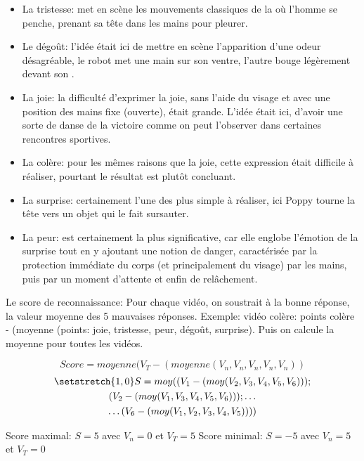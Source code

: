                 \begin{itemize}\myItemStyle
                    \item    La tristesse: met en scène les mouvements classiques de la  où l’homme se penche, prenant sa tête dans les mains pour pleurer.
                    \item    Le dégoût: l’idée était ici de mettre en scène l’apparition d’une odeur désagréable, le robot met une main sur son ventre, l’autre bouge légèrement devant son .
                    \item    La joie: la difficulté d’exprimer la joie, sans l’aide du visage et avec une position des mains fixe (ouverte), était grande. L’idée était ici, d’avoir une sorte de danse de la victoire comme on peut l’observer dans certaines rencontres sportives.
                    \item    La colère: pour les mêmes raisons que la joie, cette expression était difficile à réaliser, pourtant le résultat est plutôt concluant.
                    \item    La surprise: certainement l’une des plus simple à réaliser, ici Poppy tourne la tête vers un objet qui le fait sursauter.
                    \item    La peur: est certainement la plus significative, car elle englobe l’émotion de la surprise tout en y ajoutant une notion de danger, caractérisée par la protection immédiate du corps (et principalement du visage) par les mains, puis par un moment d’attente et enfin de relâchement.
                \end{itemize}\par%
                Le score de reconnaissance:
                Pour chaque vidéo, on soustrait à la bonne réponse, la valeur moyenne des 5 mauvaises réponses. Exemple: vidéo colère: points colère - (moyenne (points: joie, tristesse, peur, dégoût, surprise).
                Puis on calcule la moyenne pour toutes les vidéos.\par%
                \vspace{-0.35cm}
                \begin{equation*}
                    Score=moyenne(V_T-(moyenne(V_n,V_n,V_n,V_n,V_n))
                \end{equation*}
                \newline\vspace{-1.75cm}
                \begin{multline*}\setstretch{1,0}\small
                    S=moy((V_1-(moy(V_2,V_3,V_4,V_5,V_6)));\\(V_2-(moy(V_1,V_3,V_4,V_5,V_6)));\dots\\\dots(V_6-(moy(V_1,V_2,V_3,V_4,V_5))))
                \end{multline*}
                \strut\hfill Score maximal: $S=5$ avec $V_n=0$ et $V_T=5$ \hfill Score minimal: $S=-5$ avec $V_n=5$ et $V_T=0$ \hfill\strut
